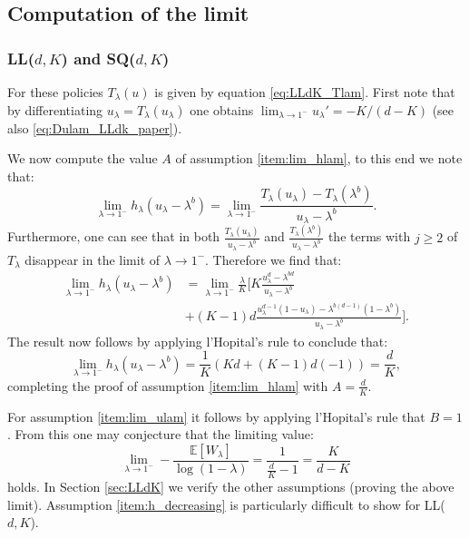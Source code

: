 \documentclass[12pt]{report}
\newcommand{\E}{\mathbb{E}}
\begin{document}
\subsection{Computation of the limit}\label{sec:computation}
\subsubsection{LL($d, K$) and SQ($d,K$)}
For these policies $T_\lambda(u)$ is given by equation \eqref{eq:LLdK_Tlam}. First note that by differentiating $u_\lambda = T_\lambda(u_\lambda)$ one obtains $\lim_{\lambda\rightarrow 1^-} u_\lambda' =-K/(d-K)$ (see also \eqref{eq:Dulam_LLdk_paper}).

We now compute the value $A$ of assumption \ref{item:lim_hlam}, to this end we note that:
$$
\lim_{\lambda \rightarrow 1^-} h_{\lambda} (u_\lambda - \lambda^b)=\lim_{\lambda \rightarrow 1^-} \frac{T_{\lambda}(u_\lambda) - T_\lambda(\lambda^b)}{u_\lambda-\lambda^b}.
$$
Furthermore, one can see that in both $\frac{T_{\lambda}(u_\lambda)} {u_\lambda-\lambda^b}$ and  $\frac{T_{\lambda}(\lambda^b)} {u_\lambda-\lambda^b}$ the  terms with $j\geq 2$ 
of $T_\lambda$ disappear in the limit of $\lambda \rightarrow 1^-$. Therefore we find that:
\begin{align*}
\lim_{\lambda\rightarrow 1^-} h_{\lambda}(u_\lambda - \lambda^b)
&=
\lim_{\lambda \rightarrow 1^-} \frac{\lambda}{K} \bigg[
K \frac{u_{\lambda}^d - \lambda^{bd}}{u_\lambda - \lambda^b}\\
& + (K-1) d \frac{u_{\lambda}^{d-1} (1-u_{\lambda}) - \lambda^{b(d-1)} (1-\lambda^b)}{u_\lambda - \lambda^b} \bigg].
\end{align*}
The result now follows by applying l'Hopital's rule to conclude that:
$$
\lim_{\lambda \rightarrow 1^-} h_{\lambda}(u_\lambda - \lambda^b)
=
\frac{1}{K} \left( Kd + (K-1) d (-1) \right) = \frac{d}{K},
$$
completing the proof of assumption \ref{item:lim_hlam} with $A = \frac{d}{K}$.

For assumption \ref{item:lim_ulam} it follows by applying l'Hopital's rule that $B=1$. From this one may conjecture that the limiting value:
\begin{equation} \label{eq:lim_LLdK}
\lim_{\lambda \rightarrow 1^-} - \frac{\E[W_\lambda]}{\log(1-\lambda)} = \frac{1}{\frac{d}{K}-1} = \frac{K}{d-K}
\end{equation}
holds. In Section \ref{sec:LLdK} we verify the other assumptions (proving the above limit). Assumption \ref{item:h_decreasing} is particularly difficult to show for LL($d, K$).
\end{document}
